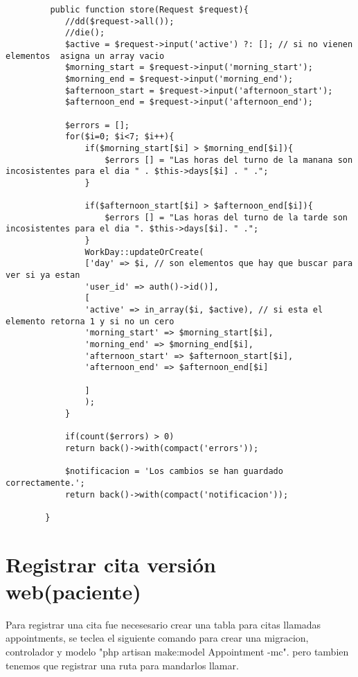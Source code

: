 \documentclass[a4paper]{article}
\begin{document}
	\begin{lstlisting}
		 public function store(Request $request){
			//dd($request->all());
			//die();
			$active = $request->input('active') ?: []; // si no vienen elementos  asigna un array vacio
			$morning_start = $request->input('morning_start');
			$morning_end = $request->input('morning_end');
			$afternoon_start = $request->input('afternoon_start');
			$afternoon_end = $request->input('afternoon_end');
			
			$errors = [];
			for($i=0; $i<7; $i++){
				if($morning_start[$i] > $morning_end[$i]){
					$errors [] = "Las horas del turno de la manana son incosistentes para el dia " . $this->days[$i] . " .";
				}
				
				if($afternoon_start[$i] > $afternoon_end[$i]){
					$errors [] = "Las horas del turno de la tarde son incosistentes para el dia ". $this->days[$i]. " .";
				}
				WorkDay::updateOrCreate(
				['day' => $i, // son elementos que hay que buscar para ver si ya estan
				'user_id' => auth()->id()],
				[
				'active' => in_array($i, $active), // si esta el elemento retorna 1 y si no un cero
				'morning_start' => $morning_start[$i],
				'morning_end' => $morning_end[$i],
				'afternoon_start' => $afternoon_start[$i],
				'afternoon_end' => $afternoon_end[$i]
				
				]
				);
			}
			
			if(count($errors) > 0)
			return back()->with(compact('errors'));
			
			$notificacion = 'Los cambios se han guardado correctamente.';
			return back()->with(compact('notificacion'));
			
		}	
	\end{lstlisting}
	
	
	
	\section{Registrar cita versión web(paciente)}

	Para registrar una cita fue necesesario crear una tabla para citas llamadas appointments, se teclea el siguiente comando para crear una migracion, controlador y modelo "php artisan make:model Appointment -mc". pero tambien tenemos que registrar una ruta para mandarlos llamar.
	
\end{document}
